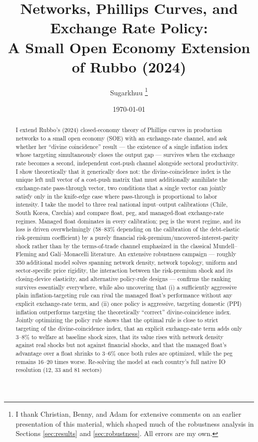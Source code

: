 \documentclass[12pt]{article}
\title{\Large Networks, Phillips Curves, and Exchange Rate Policy: \\[4pt]
A Small Open Economy Extension of Rubbo (2024)}
\author{Sugarkhuu \thanks{I thank Christian, Benny, and Adam for extensive comments on an earlier
presentation of this material, which shaped much of the robustness analysis in Sections
\ref{sec:results} and \ref{sec:robustness}. All errors are my own.}}
\date{\today}
\begin{document}
\maketitle

\begin{abstract}
\noindent I extend Rubbo's (2024) closed-economy theory of Phillips curves in production networks
to a small open economy (SOE) with an exchange-rate channel, and ask whether her ``divine
coincidence'' result --- the existence of a single inflation index whose targeting simultaneously
closes the output gap --- survives when the exchange rate becomes a second, independent cost-push
channel alongside sectoral productivity. I show theoretically that it generically does not: the
divine-coincidence index is the unique left null vector of a cost-push matrix that must additionally
annihilate the exchange-rate pass-through vector, two conditions that a single vector can jointly
satisfy only in the knife-edge case where pass-through is proportional to labor intensity. I take the
model to three real national input--output calibrations (Chile, South Korea, Czechia) and compare
float, peg, and managed-float exchange-rate regimes. Managed float dominates in every calibration;
peg is the worst regime, and its loss is driven overwhelmingly (58--83\% depending on the calibration
of the debt-elastic risk-premium coefficient) by a purely financial risk-premium/uncovered-interest-parity
shock rather than by the terms-of-trade channel emphasized in the classical Mundell--Fleming and
Gal\'i--Monacelli literature. An extensive robustness campaign --- roughly 350 additional model
solves spanning network density, network topology, uniform and sector-specific price rigidity, the
interaction between the risk-premium shock and its closing-device elasticity, and alternative
policy-rule designs --- confirms the ranking survives essentially everywhere, while also uncovering
that (i) a sufficiently aggressive plain inflation-targeting rule can rival the managed float's
performance without any explicit exchange-rate term, and (ii) once policy is aggressive, targeting
domestic (PPI) inflation outperforms targeting the theoretically ``correct'' divine-coincidence
index. Jointly optimizing the policy rule shows that the optimal rule is close to strict targeting of the divine-coincidence index, that an explicit exchange-rate term adds only 3--8\% to welfare at baseline shock sizes, that its value rises with network density against real shocks but not against financial shocks, and that the managed float's advantage over a float shrinks to 3--6\% once both rules are optimized, while the peg remains 16--20 times worse. Re-solving the model at each country's full native IO resolution (12, 33 and 81 sectors)

\end{abstract}
\end{document}
